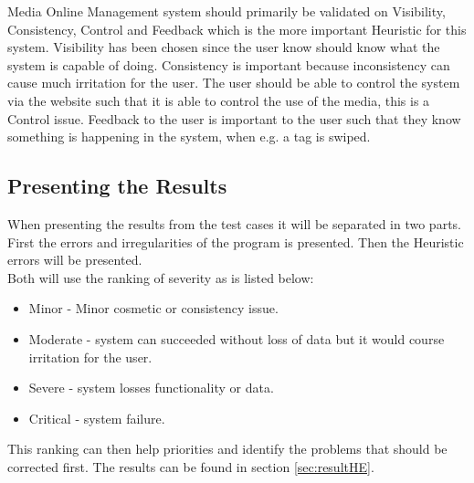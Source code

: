 Media Online Management system should primarily be validated on Visibility, Consistency, Control and Feedback which is the more important Heuristic for this system. Visibility has been chosen since the user know should know what the system is capable of doing. Consistency is important because inconsistency can cause much irritation for the user. The user should be able to control the system via the website such that it is able to control the use of the media, this is a Control issue. Feedback to the user is important to the user such that they know something is happening in the system, when e.g. a tag is swiped. 



\subsection{Presenting the Results}
When presenting the results from the test cases it will be separated in two parts. First the errors and irregularities of the program is presented. Then the Heuristic errors will be presented.\\
Both will use the ranking of severity as is listed below:

\begin{itemize}
    \item Minor - Minor cosmetic or consistency issue.
    \item Moderate - system can succeeded without loss of data but it would course irritation for the user. 
	\item Severe - system losses functionality or data.
    \item Critical - system failure.
\end{itemize}

This ranking can then help priorities and identify the problems that should be corrected first. The results can be found in section \vref{sec:resultHE}.

